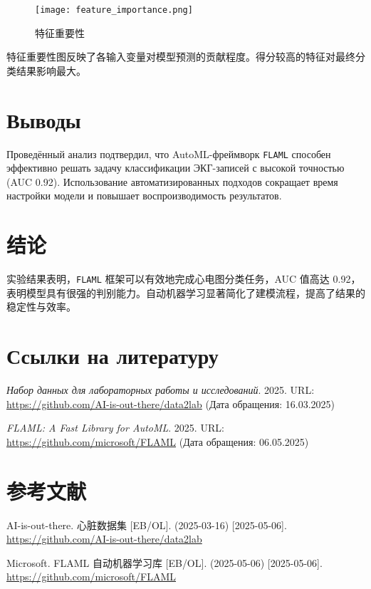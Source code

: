 \documentclass{article}
\providecommand{\pcsync}{\par\vspace{\baselineskip}}
\begin{document}
\begin{paracol}{2}
\begin{figure}[H]
\centering
\texttt{[image: feature\_importance.png]}
\caption{特征重要性}
\end{figure}

特征重要性图反映了各输入变量对模型预测的贡献程度。得分较高的特征对最终分类结果影响最大。

\switchcolumn*


\section{Выводы}
\pcsync
Проведённый анализ подтвердил, что AutoML-фреймворк \texttt{FLAML} способен эффективно решать задачу классификации ЭКГ-записей с высокой точностью (AUC 0.92). Использование автоматизированных подходов сокращает время настройки модели и повышает воспроизводимость результатов.

\switchcolumn

\section{结论}
\pcsync
实验结果表明，\texttt{FLAML} 框架可以有效地完成心电图分类任务，AUC 值高达 0.92，表明模型具有很强的判别能力。自动机器学习显著简化了建模流程，提高了结果的稳定性与效率。
\switchcolumn*
\newpage



\section{Ссылки на литературу}
\pcsync
\renewcommand{\refname}{}
\begin{thebibliography}{9}
\textit{Набор данных для лабораторных работы и исследований}. 2025. URL: \url{https://github.com/AI-is-out-there/data2lab} (Дата обращения: 16.03.2025)

\textit{FLAML: A Fast Library for AutoML}. 2025. URL: \url{https://github.com/microsoft/FLAML} (Дата обращения: 06.05.2025)
\end{thebibliography}

\vfill\null  %

\switchcolumn

\newpage
\section{参考文献}
\pcsync
\renewcommand{\refname}{}
\begin{thebibliography}{9}
AI-is-out-there. 心脏数据集 [EB/OL]. (2025-03-16) [2025-05-06]. \url{https://github.com/AI-is-out-there/data2lab}

Microsoft. FLAML 自动机器学习库 [EB/OL]. (2025-05-06) [2025-05-06]. \url{https://github.com/microsoft/FLAML}
\end{thebibliography}

\vfill\null  %

\switchcolumn*


\end{paracol}
\balance
\end{document}
